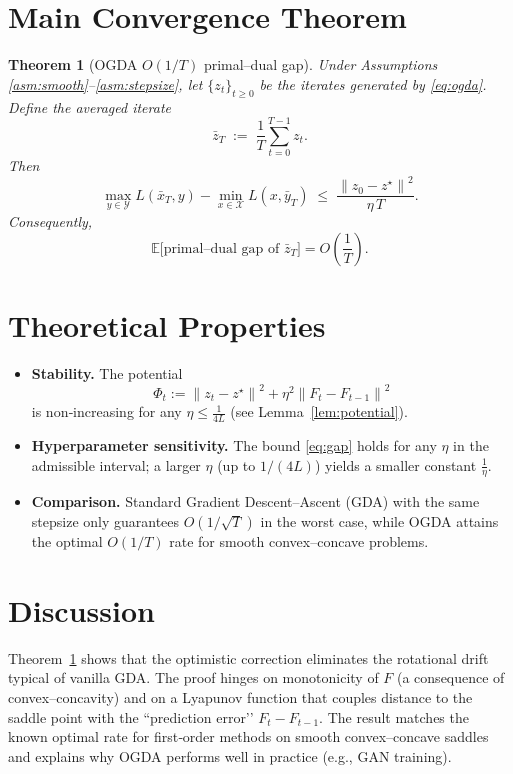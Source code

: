 \documentclass{article}
\newtheorem{theorem}{Theorem}
\newcommand{\E}{\mathbb{E}}
\newcommand{\norm}[1]{\left\|#1\right\|}
\begin{document}
\section*{Main Convergence Theorem}
\begin{theorem}[OGDA $O(1/T)$ primal–dual gap]\label{thm:ogda}
Under Assumptions \ref{asm:smooth}–\ref{asm:stepsize}, let $\{z_t\}_{t\ge0}$ be the iterates generated by \eqref{eq:ogda}.  Define the averaged iterate
\[
    \bar z_T \;:=\; \frac{1}{T}\sum_{t=0}^{T-1}z_t .
\]
Then
\begin{equation}
\label{eq:gap}
    \max_{y\in\mathcal Y} L(\bar x_T,y)-\min_{x\in\mathcal X} L(x,\bar y_T)
    \;\le\;
    \frac{\norm{z_0-z^\star}^2}{\eta\,T}.
\end{equation}
Consequently,
\[
    \E\bigl[\text{primal–dual gap of }\bar z_T\bigr]=O\!\left(\frac{1}{T}\right).
\]
\end{theorem}

\section*{Theoretical Properties}
\begin{itemize}
    \item \textbf{Stability.} The potential
    \[
        \Phi_t:=\norm{z_t-z^\star}^2+\eta^2\norm{F_t-F_{t-1}}^2
    \]
    is non‑increasing for any $\eta\le\frac{1}{4L}$ (see Lemma~\ref{lem:potential}).
    \item \textbf{Hyperparameter sensitivity.} The bound \eqref{eq:gap} holds for any $\eta$ in the admissible interval; a larger $\eta$ (up to $1/(4L)$) yields a smaller constant $\frac{1}{\eta}$.
    \item \textbf{Comparison.} Standard Gradient Descent–Ascent (GDA) with the same stepsize only guarantees $O(1/\sqrt{T})$ in the worst case, while OGDA attains the optimal $O(1/T)$ rate for smooth convex–concave problems.
\end{itemize}

\section*{Discussion}
Theorem~\ref{thm:ogda} shows that the optimistic correction eliminates the rotational drift typical of vanilla GDA.  The proof hinges on monotonicity of $F$ (a consequence of convex–concavity) and on a Lyapunov function that couples distance to the saddle point with the “prediction error’’ $F_t-F_{t-1}$.  The result matches the known optimal rate for first‑order methods on smooth convex–concave saddles and explains why OGDA performs well in practice (e.g., GAN training).
\end{document}

